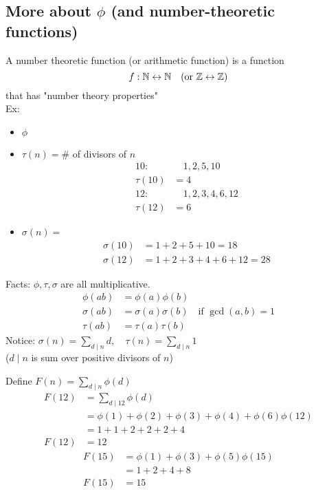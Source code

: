    \subsection{More about $\phi$ (and number-theoretic functions)}
    \begin{definition}
        A number theoretic function (or arithmetic function) is a function
        \[ f: \mathbb{N} \leftrightarrow \mathbb{N} \quad(\text{or } \mathbb{Z} \leftrightarrow \mathbb{Z}) \]
        that has "number theory properties" \\
        Ex: 
        \begin{itemize}
            \item $\phi$
            \item $\tau(n) = \#$ of divisors of $n$
            \begin{align*}
                10:&\quad 1,2,5,10 \\
                \tau(10) &= 4 \\
                12:&\quad 1,2,3,4,6,12 \\
                \tau(12) &= 6
            \end{align*}
            \item  $\sigma(n) =$ 
            \begin{align*}
                \sigma(10) &= 1 + 2 + 5 + 10 = 18 \\
                \sigma(12) &= 1+2+3+4+6+12=28
            \end{align*}            
        \end{itemize}
        Facts: $\phi,\tau,\sigma$ are all multiplicative.
        \begin{align*}
            \phi(ab) &= \phi(a)\phi(b) \\
            \sigma(ab) &= \sigma(a)\sigma(b) \quad\text{if } \gcd(a,b)=1\\
            \tau(ab) &= \tau(a)\tau(b)
        \end{align*}
        Notice: $\sigma(n) = \sum_{d\mid n}^{}d, \quad\tau(n) = \sum_{d\mid n}^{}1$ \\
        ($d\mid n$ is sum over positive divisors of $n$)        
    \end{definition}
    \begin{example}
        Define $F(n) = \sum_{d\mid n}^{}\phi(d)$
        \begin{align*}
            F(12) &= \sum_{d\mid 12}^{}\phi(d) \\
            &= \phi(1)+\phi(2)+\phi(3)+\phi(4)+\phi(6)\phi(12) \\
            &= 1+1+2+2+2+4 \\
            F(12) &= 12
        \end{align*}
        \begin{align*}
            F(15) &= \phi(1)+\phi(3)+\phi(5)\phi(15) \\
            &= 1+2+4+8 \\
            F(15) &= 15
        \end{align*}
    \end{example}
